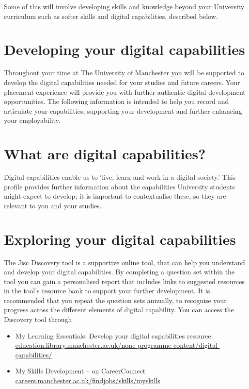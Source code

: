 \documentclass[
]{book}
\providecommand{\tightlist}{%
  \setlength{\itemsep}{0pt}\setlength{\parskip}{0pt}}
\begin{document}
Some of this will involve developing skills and knowledge beyond your University curriculum such as softer skills and digital capabilities, described below.

\section{Developing your digital capabilities}\label{developing-your-digital-capabilities}

Throughout your time at The University of Manchester you will be supported to develop the digital capabilities needed for your studies and future careers. Your placement experience will provide you with further authentic digital development opportunities. The following information is intended to help
you record and articulate your capabilities, supporting your development and further enhancing your employability.

\section{What are digital capabilities?}\label{what-are-digital-capabilities}

Digital capabilities enable us to `live, learn and work in a digital society.' This profile provides further information about the capabilities University students might expect to develop; it is important to contextualise these, so they are relevant to you and your studies.

\section{Exploring your digital capabilities}\label{exploring-your-digital-capabilities}

The Jisc Discovery tool is a supportive online tool, that can help you understand and develop your digital capabilities. By completing a question set within the tool you can gain a personalised report that includes
links to suggested resources in the tool's resource bank to support your further development. It is recommended that you repeat the question sets annually, to recognise your progress across the different elements of digital capability. You can access the Discovery tool through

\begin{itemize}
\tightlist
\item
  My Learning Essentials: Develop your digital capabilities resource. \href{https://www.education.library.manchester.ac.uk/none-programme-content/digital-capabilities/}{education.library.manchester.ac.uk/none-programme-content/digital-capabilities/}
\item
  My Skills Development -- on CareerConnect \href{https://www.careers.manchester.ac.uk/findjobs/skills/myskills/}{careers.manchester.ac.uk/findjobs/skills/myskills}
\end{itemize}
\end{document}
